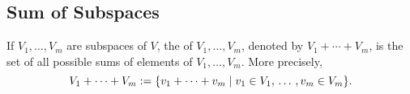 
\subsection{Sum of Subspaces}

\setcounter{thm}{35}
\begin{mydef}
  If $V_1, \ldots, V_m$ are subspaces of $V$, the  of $V_1, \ldots, V_m$, denoted by $V_1 + \cdots + V_m$, is the set of all possible sums of elements of $V_1, \ldots, V_m$. More precisely,
\begin{equation}
    V_1 + \cdots + V_m := \{v_1 + \cdots + v_m \mid v_1 \in V_1, {\, \ldots \,\,} , v_m \in V_m \}.
\end{equation}
\end{mydef}

